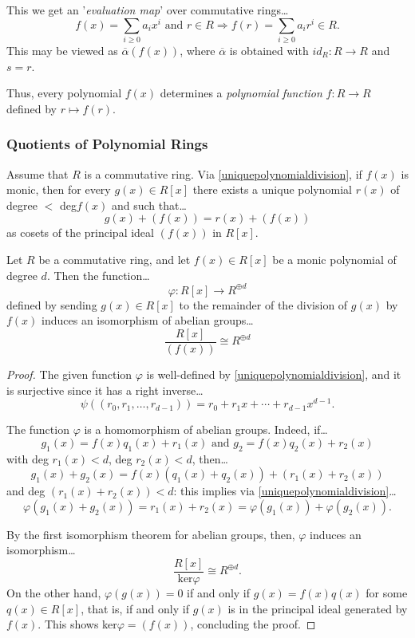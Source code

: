 \noindent This we get an '\emph{evaluation map}' over commutative rings\dots
$$f(x) = \sum_{i \geq 0} a_i x^i \textrm{ and } r \in R \Rightarrow f(r) = \sum_{i \geq 0} a_i r^i \in R.$$
This may be viewed as $\overline{\alpha}(f(x))$, where $\overline{\alpha}$ is obtained with $id_R : R \rightarrow R$ and $s = r$.\newline

\noindent Thus, every polynomial $f(x)$ determines a \emph{polynomial function}\label{polynomialfunction} $f : R \rightarrow R$ defined by $r \mapsto f(r)$.

\subsubsection{Quotients of Polynomial Rings}\label{quotientsofpolynomialrings}
Assume that $R$ is a commutative ring. Via \ref{uniquepolynomialdivision}, if $f(x)$ is monic, then for every $g(x) \in R[x]$ there exists a unique polynomial $r(x)$
of degree $<$ deg$f(x)$ and such that\dots
$$g(x) + (f(x)) = r(x) + (f(x))$$
as cosets of the principal ideal $(f(x))$ in $R[x]$.

\begin{proposition}
Let $R$ be a commutative ring, and let $f(x) \in R[x]$ be a monic polynomial of degree $d$. Then the function\dots
$$\varphi : R[x] \rightarrow R^{\oplus d}$$
defined by sending $g(x) \in R[x]$ to the remainder of the division of $g(x)$ by $f(x)$ induces an isomorphism of abelian
groups\dots
$$\frac{R[x]}{(f(x))} \cong R^{\oplus d}$$
\end{proposition}

\begin{proof}
The given function $\varphi$ is well-defined by \ref{uniquepolynomialdivision}, and it is surjective since it has a right inverse\dots
$$\psi((r_0,r_1,\dots,r_{d-1}))=r_0 + r_1x + \cdots + r_{d-1}x^{d-1}.$$

The function $\varphi$ is a homomorphism of abelian groups. Indeed, if\dots
$$g_1(x) = f(x)q_1(x) + r_1(x) \textrm{ and } g_2 = f(x)q_2(x) + r_2(x)$$
with deg $r_1(x) < d$, deg $r_2(x) < d$, then\dots
$$g_1(x)+g_2(x) = f(x)(q_1(x) + q_2(x)) + (r_1(x) + r_2(x))$$
and deg $(r_1(x) + r_2(x)) < d$: this implies via \ref{uniquepolynomialdivision}\dots
$$\varphi(g_1(x) + g_2(x)) = r_1(x) + r_2(x) = \varphi(g_1(x)) + \varphi(g_2(x)).$$

By the first isomorphism theorem for abelian groups, then, $\varphi$ induces an isomorphism\dots
$$\frac{R[x]}{\textrm{ker}\varphi} \cong R^{\oplus d}.$$
On the other hand, $\varphi(g(x)) = 0$ if and only if $g(x) = f(x)q(x)$ for some $q(x) \in R[x]$,
that is, if and only if $g(x)$ is in the principal ideal generated by $f(x)$. This shows ker$\varphi = (f(x))$,
concluding the proof.
\end{proof}

